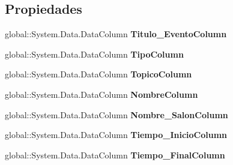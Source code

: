 \subsection*{Propiedades}
\begin{DoxyCompactItemize}
\item 
global\+::\+System.\+Data.\+Data\+Column {\bfseries Titulo\+\_\+\+Evento\+Column}\hspace{0.3cm}{\ttfamily  [get]}\label{class_resa___pro_1_1_resa_d_b_data_set_1_1_obtener_eventos_detallados_data_table_a93d03ea1f31f65597738435fa3f41f44}

\item 
global\+::\+System.\+Data.\+Data\+Column {\bfseries Tipo\+Column}\hspace{0.3cm}{\ttfamily  [get]}\label{class_resa___pro_1_1_resa_d_b_data_set_1_1_obtener_eventos_detallados_data_table_a7eb412b7c1d2be859d743b0089847ffa}

\item 
global\+::\+System.\+Data.\+Data\+Column {\bfseries Topico\+Column}\hspace{0.3cm}{\ttfamily  [get]}\label{class_resa___pro_1_1_resa_d_b_data_set_1_1_obtener_eventos_detallados_data_table_a7230da63b8ea49dcface1aa114c45dc2}

\item 
global\+::\+System.\+Data.\+Data\+Column {\bfseries Nombre\+Column}\hspace{0.3cm}{\ttfamily  [get]}\label{class_resa___pro_1_1_resa_d_b_data_set_1_1_obtener_eventos_detallados_data_table_a607a047f08fb117bd088ec00c0e764eb}

\item 
global\+::\+System.\+Data.\+Data\+Column {\bfseries Nombre\+\_\+\+Salon\+Column}\hspace{0.3cm}{\ttfamily  [get]}\label{class_resa___pro_1_1_resa_d_b_data_set_1_1_obtener_eventos_detallados_data_table_a6f0afe80d2e7885c89a11d4501395b6a}

\item 
global\+::\+System.\+Data.\+Data\+Column {\bfseries Tiempo\+\_\+\+Inicio\+Column}\hspace{0.3cm}{\ttfamily  [get]}\label{class_resa___pro_1_1_resa_d_b_data_set_1_1_obtener_eventos_detallados_data_table_ae945f26184af5674811dcbc1574c22a0}

\item 
global\+::\+System.\+Data.\+Data\+Column {\bfseries Tiempo\+\_\+\+Final\+Column}\hspace{0.3cm}{\ttfamily  [get]}\label{class_resa___pro_1_1_resa_d_b_data_set_1_1_obtener_eventos_detallados_data_table_ab24ff5020f352769065952d509518f5a}


\end{DoxyCompactItemize}
